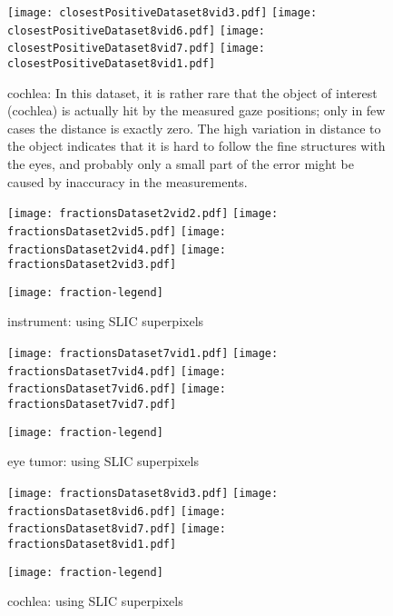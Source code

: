 \begin{figure}[ht]
	  \texttt{[image: closestPositiveDataset8vid3.pdf]}
	  \texttt{[image: closestPositiveDataset8vid6.pdf]}
	  \texttt{[image: closestPositiveDataset8vid7.pdf]}
	  \texttt{[image: closestPositiveDataset8vid1.pdf]}
	  \caption{cochlea: In this dataset, it is rather rare that the object of interest (cochlea) is actually hit by the measured gaze positions; only in few cases the distance is exactly zero. The high variation in distance to the object indicates that it is hard to follow the fine structures with the eyes, and probably only a small part of the error might be caused by inaccuracy in the measurements.}
	\label{fig:distanceToClosestPositiveD8}
\end{figure}


\begin{figure}[ht]
	  \texttt{[image: fractionsDataset2vid2.pdf]}
	  \texttt{[image: fractionsDataset2vid5.pdf]}
	  \texttt{[image: fractionsDataset2vid4.pdf]}
	  \texttt{[image: fractionsDataset2vid3.pdf]}
	  
	  \centering
	  \texttt{[image: fraction-legend]}
	  \caption{instrument: using SLIC superpixels}
	\label{fig:positiveFractionD6}
\end{figure}

\begin{figure}[ht]
	  \texttt{[image: fractionsDataset7vid1.pdf]}
	  \texttt{[image: fractionsDataset7vid4.pdf]}
	  \texttt{[image: fractionsDataset7vid6.pdf]}
	  \texttt{[image: fractionsDataset7vid7.pdf]}
	  
	  \centering
	  \texttt{[image: fraction-legend]}
	  \caption{eye tumor: using SLIC superpixels}
	\label{fig:positiveFractionD7}
\end{figure}

\begin{figure}[ht]
	  \texttt{[image: fractionsDataset8vid3.pdf]}
	  \texttt{[image: fractionsDataset8vid6.pdf]}
	  \texttt{[image: fractionsDataset8vid7.pdf]}
	  \texttt{[image: fractionsDataset8vid1.pdf]}
	  
	  \centering
	  \texttt{[image: fraction-legend]}
	  \caption{cochlea: using SLIC superpixels}
	\label{fig:positiveFractionD8}
\end{figure}

